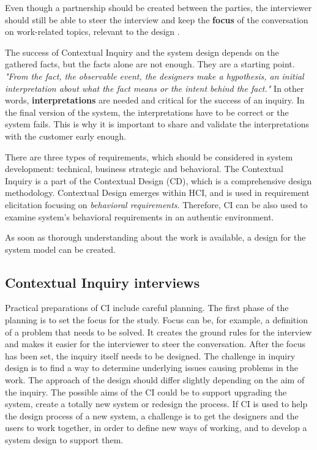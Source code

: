 \documentclass[12pt,a4paper,oneside,pdftex]{report}
\begin{document}
Even though a partnership should be created between the parties, the interviewer should still be able to steer the interview and keep the \textbf{focus} of the conversation on work-related topics, relevant to the design \citep{RefWorks:21}. 

The success of Contextual Inquiry and the system design depends on the gathered facts, but the facts alone are not enough. They are a starting point. \textit{"From the fact, the observable event, the designers make a hypothesis, an initial interpretation about what the fact means or the intent behind the fact."}\citep{RefWorks:21} In other words, \textbf{interpretations} are needed and critical for the success of an inquiry. In the final version of the system, the interpretations have to be correct or the system fails. This is why it is important to share and validate the interpretations with the customer early enough. \citep{RefWorks:21}

There are three types of requirements, which should be considered in system development: technical, business strategic and behavioral. The Contextual Inquiry is a part of the Contextual Design (CD), which is a comprehensive design methodology. Contextual Design emerges within HCI, and is used in requirement elicitation focusing on \emph{behavioral requirements}. Therefore, CI can be also used to examine system's behavioral requirements in an authentic environment. \citep{RefWorks:33, RefWorks:36}

As soon as thorough understanding about the work is available, a design for the system model can be created.\citep{RefWorks:14} 

\subsection{Contextual Inquiry interviews}

Practical preparations of CI include careful planning. The first phase of the planning is to set the focus for the study. Focus can be, for example, a definition of a problem that needs to be solved. It creates the ground rules for the interview and makes it easier for the interviewer to steer the conversation. After the focus has been set, the inquiry itself needs to be designed. The challenge in inquiry design is to find a way to determine underlying issues causing problems in the work. The approach of the design should differ slightly depending on the aim of the inquiry. The possible aims of the CI could be to support upgrading the system, create a totally new system or redesign the process. If CI is used to help the design process of a new system, a challenge is to get the designers and the users to work together, in order to define new ways of working, and to develop a system design to support them. \citep{RefWorks:21} 
\end{document}
